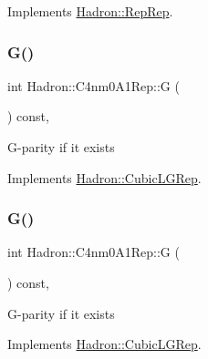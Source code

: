 Implements \mbox{\hyperlink{structHadron_1_1RepRep_a92c8802e5ed7afd7da43ccfd5b7cd92b}{Hadron\+::\+Rep\+Rep}}.

\mbox{\label{structHadron_1_1C4nm0A1Rep_a4f044ae7849e3f42a9f5aa36150bcd80}} 
\subsubsection{\texorpdfstring{G()}{G()}\hspace{0.1cm}{\footnotesize\ttfamily [1/3]}}
{\footnotesize\ttfamily int Hadron\+::\+C4nm0\+A1\+Rep\+::G (\begin{DoxyParamCaption}{ }\end{DoxyParamCaption}) const\hspace{0.3cm}{\ttfamily [inline]}, {\ttfamily [virtual]}}

G-\/parity if it exists 

Implements \mbox{\hyperlink{structHadron_1_1CubicLGRep_ace26f7b2d55e3a668a14cb9026da5231}{Hadron\+::\+Cubic\+L\+G\+Rep}}.

\mbox{\label{structHadron_1_1C4nm0A1Rep_a4f044ae7849e3f42a9f5aa36150bcd80}} 
\subsubsection{\texorpdfstring{G()}{G()}\hspace{0.1cm}{\footnotesize\ttfamily [2/3]}}
{\footnotesize\ttfamily int Hadron\+::\+C4nm0\+A1\+Rep\+::G (\begin{DoxyParamCaption}{ }\end{DoxyParamCaption}) const\hspace{0.3cm}{\ttfamily [inline]}, {\ttfamily [virtual]}}

G-\/parity if it exists 

Implements \mbox{\hyperlink{structHadron_1_1CubicLGRep_ace26f7b2d55e3a668a14cb9026da5231}{Hadron\+::\+Cubic\+L\+G\+Rep}}.

\mbox{\label{structHadron_1_1C4nm0A1Rep_a4f044ae7849e3f42a9f5aa36150bcd80}} 

